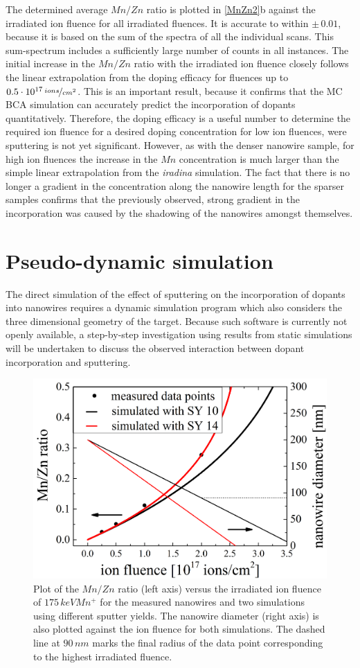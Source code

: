 The determined average $Mn/Zn$ ratio is plotted in \ref{MnZn2}b against the irradiated ion fluence for all irradiated fluences. It is accurate to within $\pm\,0.01$, because it is based on the sum of the spectra of all the individual scans. This sum-spectrum includes a sufficiently large number of counts in all instances. The initial increase in the $Mn/Zn$ ratio with the irradiated ion fluence closely follows the linear extrapolation from the doping efficacy for fluences up to $0.5\cdot 10^{17}\,\nicefrac{ions}{cm^2}$. This is an important result, because it confirms that the MC BCA simulation can accurately predict the incorporation of dopants quantitatively. Therefore, the doping efficacy is a useful number to determine the required ion fluence for a desired doping concentration for low ion fluences, were sputtering is not yet significant. However, as with the denser nanowire sample, for high ion fluences the increase in the $Mn$ concentration is much larger than the simple linear extrapolation from the \emph{iradina} simulation. The fact that there is no longer a gradient in the concentration along the nanowire length for the sparser samples confirms that the previously observed, strong gradient in the incorporation was caused by the shadowing of the nanowires amongst themselves.


\section{Pseudo-dynamic simulation}

The direct simulation of the effect of sputtering on the incorporation of dopants into nanowires requires a dynamic simulation program which also considers the three dimensional geometry of the target. Because such software is currently not openly available, a step-by-step investigation using results from static simulations will be undertaken to discuss the observed interaction between dopant incorporation and sputtering.

\begin{figure}
	\centering
		\includegraphics[width=.5\textwidth]{images/staticsputteryield.png}
	\caption{Plot of the $Mn/Zn$ ratio (left axis) versus the irradiated ion fluence of $175\,keV Mn^+$ for the measured nanowires and two simulations using different sputter yields. The nanowire diameter (right axis) is also plotted against the ion fluence for both simulations. The dashed line at $90\,nm$ marks the final radius of the data point corresponding to the highest irradiated fluence.}
	\label{staticsputter}
\end{figure} 

